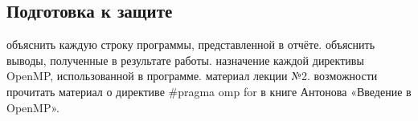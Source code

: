 { %
	\subsection{Подготовка к защите}
	\Large
	\begin{enumerate}
		 объяснить каждую строку программы, представленной в отчёте.
		 объяснить выводы, полученные в результате работы.
		 назначение каждой директивы OpenMP, использованной в программе.
		 материал лекции №2.
		 возможности прочитать материал о директиве \#pragma omp for в книге Антонова «Введение в OpenMP».
	\end{enumerate}
}